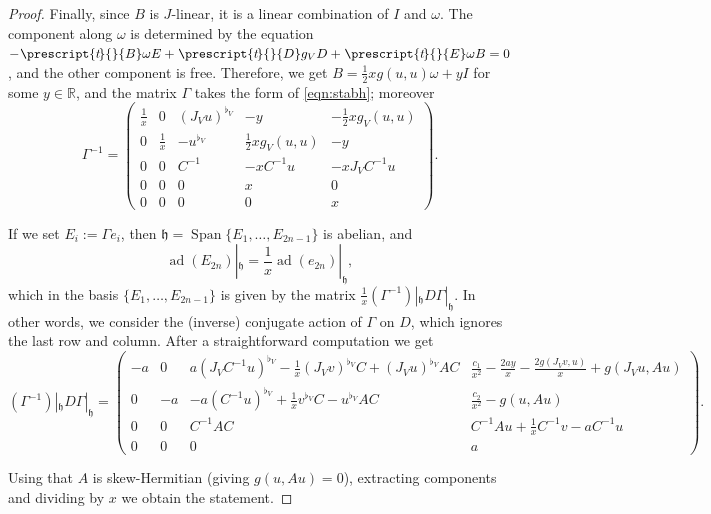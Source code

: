 \documentclass{article}
\theoremstyle{definition}
\DeclareMathOperator{\ad}{ad}
\newcommand{\R}{\mathbb{R}}
\newcommand{\frh}{\mathfrak{h}}
\newcommand{\tran}[1]{\hspace{.2mm}\prescript{t\hspace{-.5mm}}{}{#1}}
\newcommand{\Span}[1]{\operatorname{Span}\{#1\}}
\newcommand{\lie}[1]{\mathfrak{#1}}
\begin{document}
\begin{proof}
    Finally, since $B$ is $J$-linear, it is a linear combination of $I$ and $\omega$. The component along $\omega$ is determined by the equation $-\tran B\omega E +\tran Dg_V D+\tran E\omega B=0$, and the other component is free. Therefore, we get $B=\frac{1}{2}xg(u,u)\omega+yI$ for some $y\in\R$, and the matrix $\Gamma$ takes the form of \eqref{eqn:stabh}; moreover $$\Gamma^{-1}=\begin{pmatrix}
        \frac{1}{x} & 0 & (J_Vu)^{\flat_V} & -y & -\frac{1}{2}xg_V(u,u)\\
        0 & \frac{1}{x} & - u^{\flat_V} & \frac{1}{2}xg_V(u,u) & -y\\
        0 & 0 & C^{-1} & -xC^{-1}u & -xJ_VC^{-1}u\\
        0 & 0 & 0 & x & 0 \\
        0 & 0 & 0 & 0 & x
    \end{pmatrix}.$$

    If we set $E_i:=\Gamma e_i$, then $\lie h=\Span{E_1,\dotsc, E_{2n-1}}$ is abelian, and $$\ad(E_{2n})|_{\lie h}=\frac1x\ad(e_{2n})|_{\lie h},$$ which in the basis $\{E_1,\dotsc, E_{2n-1}\}$ is given by the matrix $\frac{1}{x}(\Gamma^{-1})|_{\frh}D\Gamma|_\frh$. In other words, we consider the (inverse) conjugate action of $\Gamma$ on $D$, which ignores the last row and column. After a straightforward computation we get $$(\Gamma^{-1})|_{\frh}D\Gamma|_\frh=\left(\begin{smallmatrix}
        -a & 0 & a(J_VC^{-1}u)^{\flat_V}-\frac1x(J_Vv)^{\flat_V} C+(J_Vu)^{\flat_V} AC & \frac{c_1}{x^2}-\frac{2ay}{x}-\frac{2g(J_V v,u)}{x}+g(J_Vu, Au)\\
        0 & -a & -a(C^{-1}u)^{\flat_V} +\frac{1}{x}v^{\flat_V} C-u^{\flat_V} AC&\frac{c_2}{x^2}-g(u,Au)\\
        0 & 0 & C^{-1}AC & C^{-1}Au+\frac{1}{x}C^{-1}v-aC^{-1}u\\
        0 & 0 & 0 & a
    \end{smallmatrix}\right).$$

    Using that $A$ is skew-Hermitian (giving $g(u,Au)=0$), extracting components and dividing by $x$ we obtain the statement.
\end{proof}
\end{document}
